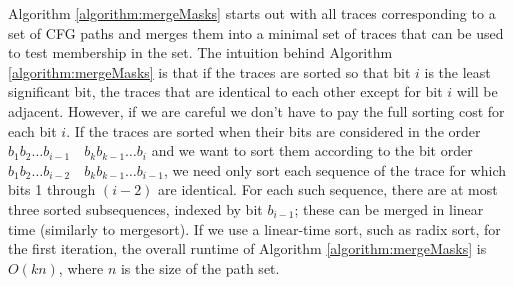 \documentclass[12pt]{gatech-thesis}
\begin{document}

Algorithm \ref{algorithm:mergeMasks} starts out with all traces corresponding to a set of CFG paths and merges them into a minimal set of traces that can be used to test membership in the set. 
The intuition behind Algorithm \ref{algorithm:mergeMasks} is that if the traces are sorted so that bit $i$ is the least significant bit, the traces that are identical to each other except for bit $i$ will be adjacent. 
However, if we are careful we don't have to pay the full sorting cost for each bit $i$. 
If the traces are sorted when their bits are considered in the order $b_{1} b_{2} \dots b_{i - 1} \quad b_{k} b_{k - 1} \dots b_{i} $ and we want to sort them according to the bit order $b_{1} b_{2} \dots b_{i - 2} \quad b_{k} b_{k - 1} \dots b_{i - 1} $, we need only sort each sequence of the trace for which bits 1 through $(i-2)$ are identical. 
For each such sequence, there are at most three sorted subsequences, indexed by bit $b_{i-1}$; these can be merged in linear time (similarly to mergesort).
If we use a linear-time sort, such as radix sort, for the first iteration, the overall runtime of Algorithm \ref{algorithm:mergeMasks} is $O(k n)$, where $n$ is the size of the path set.
\end{document}

